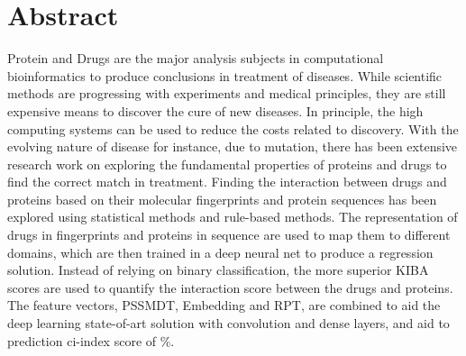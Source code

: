 

\chapter*{Abstract}
\doublespacing
Protein and Drugs are the major analysis subjects in computational bioinformatics to produce conclusions in treatment of diseases. While scientific methods are progressing with experiments and medical principles, they are still expensive means to discover the cure of new diseases. In principle, the high computing systems can be used to reduce the costs related to discovery. With the evolving nature of disease for instance, due to mutation, there has been extensive research work on exploring the fundamental properties of proteins and drugs to find the correct match in treatment. Finding the interaction between drugs and proteins based on their molecular fingerprints and protein sequences has been explored using statistical methods and rule-based methods. The representation of drugs in fingerprints and proteins in sequence are used to map them to different domains, which are then trained in a deep neural net to produce a regression solution. Instead of relying on binary classification, the more superior KIBA scores are used to quantify the interaction score between the drugs and proteins. The feature vectors, PSSMDT, Embedding and RPT, are combined to aid the deep learning state-of-art solution with convolution and dense layers, and aid to prediction ci-index score of \%.